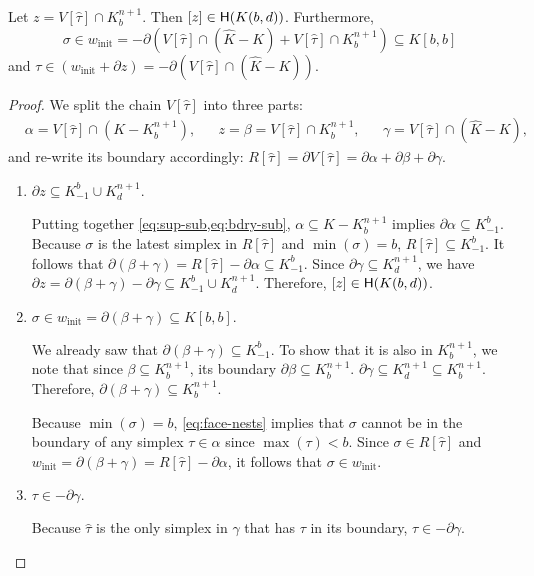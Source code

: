 \documentclass[cleveref,a4paper,english,nolineno]{socg-lipics-v2021}
\newcommand{\Hgr}{{\sf H}}
\newcommand{\cone}[1]{\hat{#1}}
\newcommand{\bdry}{\partial}
\newcommand{\cK}{\cone{K}}
\newcommand{\subK}[1]{K_{-1}^{#1}}
\newcommand{\supK}[1]{K_{#1}^{n+1}}
\newcommand{\ssx}{\sigma}
\newcommand{\tsx}{\tau}
\newcommand{\ctsx}{\cone{\tsx}}
\newcommand{\winit}{w_\textrm{init}}
\begin{document}
    \begin{claim}
        \label{clm:extended-cc-structure}
        Let $z = V[\ctsx] \cap \supK{b}$. Then $[z] \in \Hgr(K(b,d))$.
        Furthermore,
        \[
            \ssx \in \winit = -\bdry \left( V[\ctsx] \cap (\cK - K) + V[\ctsx] \cap \supK{b} \right) \subseteq K[b,b]
        \]
        and $\tsx \in \left( \winit + \bdry z \right) = -\bdry \left( V[\ctsx] \cap (\cK - K) \right)$.
    \end{claim}
    \begin{proof}
        We split the chain $V[\ctsx]$ into three parts:
        \begin{align*}
            & \alpha = V[\ctsx] \cap (K - \supK{b}), &
            & z = \beta  = V[\ctsx] \cap \supK{b}, &
            & \gamma = V[\ctsx] \cap (\cK - K),
        \end{align*}
        and re-write its boundary accordingly:
        $
            R[\ctsx] = \bdry V[\ctsx] = \bdry \alpha + \bdry \beta + \bdry \gamma.
        $

        \begin{enumerate}
        \item
            $\bdry z \subseteq \subK{b} \cup \supK{d}$.

            Putting together \cref{eq:sup-sub,eq:bdry-sub},
            $\alpha \subseteq K - \supK{b}$ implies $\bdry \alpha \subseteq \subK{b}$.
            Because $\ssx$ is the latest simplex in $R[\ctsx]$ and $\min(\ssx) = b$,
            $R[\ctsx] \subseteq \subK{b}$.
            It follows that $\bdry (\beta + \gamma) = R[\ctsx] - \bdry \alpha \subseteq \subK{b}$.
            Since $\bdry \gamma \subseteq \supK{d}$, we have
            $\bdry z = \bdry (\beta + \gamma) - \bdry \gamma \subseteq \subK{b} \cup \supK{d}$.
            Therefore, $[z] \in \Hgr(K(b,d))$.

        \item
            $\ssx \in \winit = \bdry(\beta + \gamma) \subseteq K[b,b].$

            We already saw that $\bdry (\beta + \gamma) \subseteq \subK{b}$.
            To show that it is also in $\supK{b}$, we note that
            since $\beta \subseteq \supK{b}$, its boundary $\bdry \beta \subseteq \supK{b}$.
            $\bdry \gamma \subseteq \supK{d} \subseteq \supK{b}$.
            Therefore, $\bdry (\beta + \gamma) \subseteq \supK{b}$.

            Because $\min(\ssx) = b$, \cref{eq:face-nests} implies that $\ssx$
            cannot be in the boundary of any simplex $\tsx \in \alpha$ since
            $\max(\tsx) < b$. Since $\ssx \in R[\ctsx]$ and
            $\winit = \bdry(\beta + \gamma) = R[\ctsx] - \bdry \alpha$, it
            follows that $\ssx \in \winit$.

        \item
            $\tsx \in -\bdry \gamma.$

            Because $\ctsx$ is the only simplex in $\gamma$ that has $\tsx$ in
            its boundary, $\tsx \in -\bdry \gamma$.
            \qedhere
        \end{enumerate}
    \end{proof}
\end{document}
